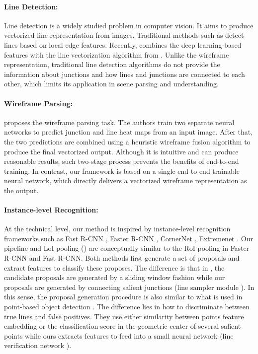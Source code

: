 \documentclass[10pt,twocolumn,letterpaper]{article}
\begin{document}
\paragraph{Line Detection:} Line detection is a widely studied problem in computer vision. It aims to produce vectorized line representation from images. Traditional methods such as \cite{stephens1991probabilistic,von2010lsd} detect lines based on local edge features. Recently, \cite{xue2018learning} combines the deep learning-based features with the line vectorization algorithm from \cite{von2010lsd}. Unlike the wireframe representation, traditional line detection algorithms do not provide the information about junctions and how lines and junctions are connected to each other, which limits its application in scene parsing and understanding.

\paragraph{Wireframe Parsing:} \cite{Huang:2018:LPW} proposes the wireframe parsing task. The authors train two separate neural networks to predict junction and line heat maps from an input image. After that, the two predictions are combined using a heuristic wireframe fusion algorithm to produce the final vectorized output. Although it is intuitive and can produce reasonable results, such two-stage process prevents the benefits of end-to-end training. In contrast, our framework is based on a single end-to-end trainable neural network, which directly delivers a vectorized wireframe representation as the output. 

\paragraph{Instance-level Recognition:} At the technical level, our method is inspired by instance-level recognition frameworks such as Fast R-CNN \cite{girshick2015fast}, Faster R-CNN \cite{ren2015faster}, CornerNet \cite{law2018cornernet}, Extremenet \cite{zhou2019bottom}. Our pipeline and LoI pooling () are conceptually similar to the RoI pooling in Faster R-CNN and Fast R-CNN. Both methods first generate a set of proposals and extract features to classify these proposes. The difference is that in \cite{ren2015faster, girshick2015fast}, the candidate proposals are generated by a sliding window fashion while our proposals are generated by connecting salient junctions (line sampler module ). In this sense, the proposal generation procedure is also similar to what is used in point-based object detection \cite{law2018cornernet,zhou2019bottom}. The difference lies in how to discriminate between true lines and false positives. They use either similarity between points feature embedding \cite{law2018cornernet} or the classification score in the geometric center of several salient points \cite{zhou2019bottom} while ours extracts features to feed into a small neural network (line verification network ).
\end{document}
